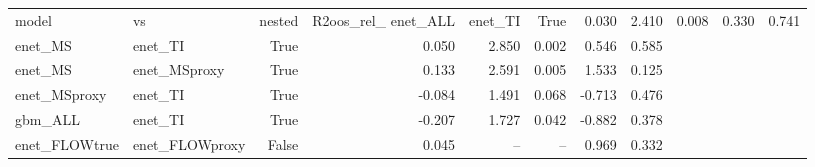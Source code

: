 \begin{tabular}{llrrrrrr}
\toprule
model & vs & nested & R2oos_rel_%
\midrule
enet_ALL & enet_TI & True & 0.030 & 2.410 & 0.008 & 0.330 & 0.741 \\
enet_MS & enet_TI & True & 0.050 & 2.850 & 0.002 & 0.546 & 0.585 \\
enet_MS & enet_MSproxy & True & 0.133 & 2.591 & 0.005 & 1.533 & 0.125 \\
enet_MSproxy & enet_TI & True & -0.084 & 1.491 & 0.068 & -0.713 & 0.476 \\
gbm_ALL & enet_TI & True & -0.207 & 1.727 & 0.042 & -0.882 & 0.378 \\
enet_FLOWtrue & enet_FLOWproxy & False & 0.045 & -- & -- & 0.969 & 0.332 \\
\bottomrule
\end{tabular}
